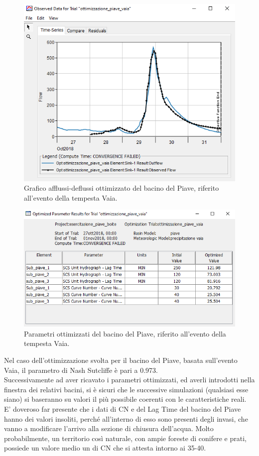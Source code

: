 \begin{figure}[H]\centering
    \includegraphics[scale=1]{immagini/ottim_piave.PNG}
    \caption{Grafico afflussi-deflussi ottimizzato del bacino del Piave, riferito all'evento della tempesta Vaia.}
        \label{ottim_piave}    
\end{figure}

\begin{figure}[H]\centering
    \includegraphics[scale=1]{immagini/par_ottimiz_piave.PNG}
    \caption{Parametri ottimizzati del bacino del Piave, riferito all'evento della tempesta Vaia.}
        \label{par_ottim_boite}    
    \end{figure}

Nel caso dell'ottimizzazione svolta per il bacino del Piave, basata sull'evento Vaia, il parametro di Nash Sutcliffe è pari a 0.973.\\
Successivamente ad aver ricavato i parametri ottimizzati, ed averli introdotti nella finestra dei relativi bacini, si è sicuri che le successive simulazioni (qualsiasi esse siano) si baseranno su valori il più possibile coerenti con le caratteristiche reali.\\
E' doveroso far presente che i dati di CN e del Lag Time del bacino del Piave hanno dei valori insoliti, perché all'interno di esso sono presenti degli invasi, che vanno a modificare l'arrivo alla sezione di chiusura dell'acqua. Molto probabilmente, un territorio così naturale, con ampie foreste di conifere e prati, possiede un valore medio un di CN che si attesta intorno ai 35-40.

